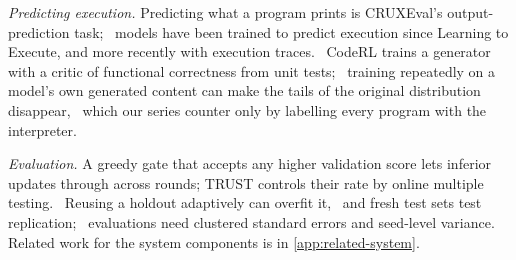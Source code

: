 \emph{Predicting execution.} Predicting what a program prints is CRUXEval's output-prediction
task;~\citep{cruxeval2024} models have been trained to predict execution since Learning to
Execute, and more recently with execution traces.~\citep{learningtoexecute2014,codeexecutor2023,semcoder2024}
CodeRL trains a generator with a critic of functional correctness from unit tests;~\citep{coderl2022}
training repeatedly on a model's own generated content can make the tails of the original distribution
disappear,~\citep{collapse2023} which our series counter only by labelling every program with the
interpreter.

\emph{Evaluation.} A greedy gate that accepts any higher validation score lets inferior updates through
across rounds; TRUST controls their rate by online multiple testing.~\citep{trust2026} Reusing a
holdout adaptively can overfit it,~\citep{holdout2015} and fresh test sets test
replication;~\citep{recht2019} evaluations need clustered standard errors and seed-level
variance.~\citep{errorbars2024,benchvariance2021,precipice2021} Related work for the system
components is in \cref{app:related-system}.
